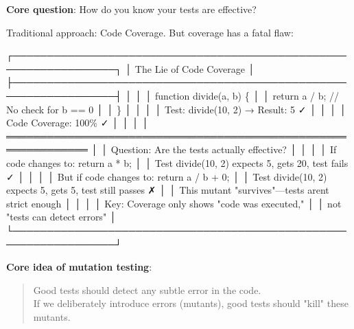 \documentclass[
]{article}
\newenvironment{Shaded}{}{}
\newcommand{\NormalTok}[1]{#1}
\begin{document}
\textbf{Core question}: How do you know your tests are effective?

Traditional approach: Code Coverage. But coverage has a fatal flaw:

\begin{Shaded}
\begin{Highlighting}[]
\NormalTok{┌─────────────────────────────────────────────────────────────────┐}
\NormalTok{│                   The Lie of Code Coverage                       │}
\NormalTok{├─────────────────────────────────────────────────────────────────┤}
\NormalTok{│                                                                  │}
\NormalTok{│  function divide(a, b) \{                                         │}
\NormalTok{│    return a / b;  // No check for b == 0                        │}
\NormalTok{│  \}                                                               │}
\NormalTok{│                                                                  │}
\NormalTok{│  Test: divide(10, 2)  →  Result: 5  ✓                           │}
\NormalTok{│                                                                  │}
\NormalTok{│  Code Coverage: 100\%  ✓                                         │}
\NormalTok{│                                                                  │}
\NormalTok{│  ══════════════════════════════════════════════════════════════  │}
\NormalTok{│  Question: Are the tests actually effective?                    │}
\NormalTok{│                                                                  │}
\NormalTok{│  If code changes to: return a * b;                              │}
\NormalTok{│  Test divide(10, 2) expects 5, gets 20, test fails ✓            │}
\NormalTok{│                                                                  │}
\NormalTok{│  But if code changes to: return a / b + 0;                      │}
\NormalTok{│  Test divide(10, 2) expects 5, gets 5, test still passes ✗      │}
\NormalTok{│  This mutant "survives"—tests aren\textquotesingle{}t strict enough              │}
\NormalTok{│                                                                  │}
\NormalTok{│  Key: Coverage only shows "code was executed,"                  │}
\NormalTok{│       not "tests can detect errors"                             │}
\NormalTok{└─────────────────────────────────────────────────────────────────┘}
\end{Highlighting}
\end{Shaded}

\textbf{Core idea of mutation testing}:

\begin{quote}
Good tests should detect any subtle error in the code.\\
If we deliberately introduce errors (mutants), good tests should "kill"
these mutants.
\end{quote}
\end{document}

